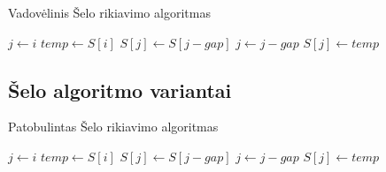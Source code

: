 \documentclass{VUMIFInfKursinis}
\begin{document}
\begin{algorithm}[H]
  \caption{Vadovėlinis Šelo rikiavimo algoritmas}\label{alg:tss}
  \begin{algorithmic}[1]
      \State $j\gets i$
      \State $temp\gets S[i]$\label{alg:tss:assign1}
      \label{alg:tss:while:start}
        \State $S[j]\gets S[j - gap]$
        \State $j\gets j-gap$
      \EndWhile\label{alg:tss:while:end}
      \State $S[j]\gets temp$\label{alg:tss:assign2}
    \EndFor
  \EndFor
  \end{algorithmic}
\end{algorithm}

\subsection{Šelo algoritmo variantai}

\cite{sedgewick1996analysis}


\begin{algorithm}[H]
  \caption{Patobulintas Šelo rikiavimo algoritmas}\label{alg:iss}
  \begin{algorithmic}[1]
      \label{alg:iss:check}
        \State $j\gets i$\label{alg:iss:inner:start}
        \State $temp\gets S[i]$
        \Repeat\label{alg:iss:loop:start}
          \State $S[j]\gets S[j - gap]$
          \State $j\gets j-gap$
        \label{alg:iss:loop:end}
        \State $S[j]\gets temp$\label{alg:iss:inner:end}
      \EndIf
    \EndFor
  \EndFor
  \end{algorithmic}
\end{algorithm}

\cite{Radavičius_Baranauskas_2013}




\end{document}
